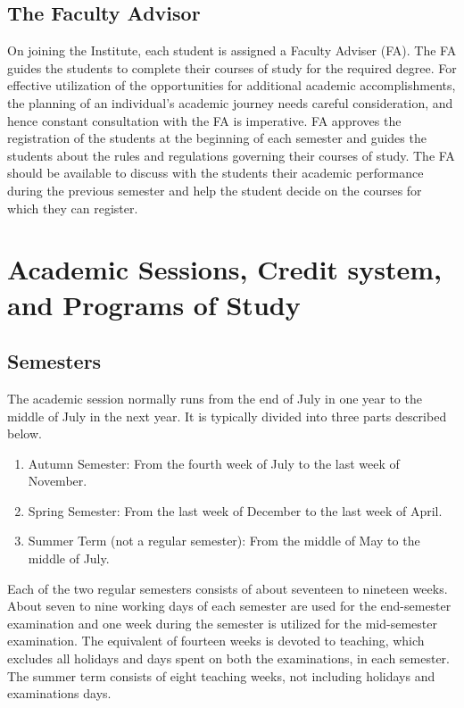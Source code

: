 \documentclass[a4paper, 12pt]{article}
\begin{document}
\subsection{The Faculty Advisor}

On joining the Institute, each student is assigned a Faculty Adviser (FA). The FA guides the students to complete their courses of study for the required degree. For effective utilization of the opportunities for additional academic accomplishments, the planning of an individual’s academic journey needs careful consideration, and hence constant consultation with the FA is imperative. FA approves the registration of the students at the beginning of each semester and guides the students about the rules and regulations governing their courses of study. The FA should be available to discuss with the students their academic performance during the previous semester and help the student decide on the courses for which they can register.

\section{Academic Sessions, Credit system, and Programs of Study}

\subsection{Semesters}

The academic session normally runs from the end of July in one year to the middle of July in the next year. It is typically divided into three parts described below.

\begin{enumerate}
	\item Autumn Semester: From the fourth week of July to the last week of November.
	\item Spring Semester: From the last week of December to the last week of April.
	\item Summer Term (not a regular semester): From the middle of May to the middle of July.
\end{enumerate}

Each of the two regular semesters consists of about seventeen to nineteen weeks. About seven to nine working days of each semester are used for the end-semester examination and one week during the semester is utilized for the mid-semester examination. The equivalent of fourteen weeks is devoted to teaching, which excludes all holidays and days spent on both the examinations, in each semester. The summer term consists of eight teaching weeks, not including holidays and examinations days.
\end{document}
